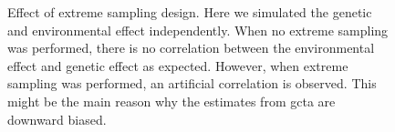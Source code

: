 \documentclass[12pt]{scrbook}
\begin{document}
\begin{figure}
	\centering
	\caption[Effect of Extreme Sampling Design]
	{Effect of extreme sampling design.
		Here we simulated the genetic and environmental effect independently.
		When no extreme sampling was performed, there is no correlation between the environmental effect and genetic effect as expected.
		However, when extreme sampling was performed, an artificial correlation is observed.
		This might be the main reason why the estimates from \gls{gcta} are downward biased.
	} 
	\label{fig:extremeSampling}
\end{figure}
\end{document}
